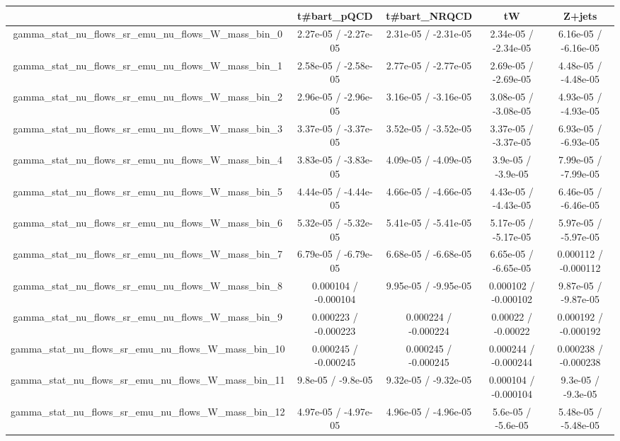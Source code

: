 \documentclass[10pt]{article}
\begin{document}
\begin{table}[htbp]
\begin{center}
\begin{tabular}{|c|c|c|c|c|}
\hline 
      & t#bar{t}_{pQCD}      & t#bar{t}_{NRQCD}      & tW      & Z+jets \\ 
\hline 
  gamma_stat_nu_flows_sr_emu_nu_flows_W_mass_bin_0 & 2.27e-05 / -2.27e-05 & 2.31e-05 / -2.31e-05 & 2.34e-05 / -2.34e-05 & 6.16e-05 / -6.16e-05 \\ 
  gamma_stat_nu_flows_sr_emu_nu_flows_W_mass_bin_1 & 2.58e-05 / -2.58e-05 & 2.77e-05 / -2.77e-05 & 2.69e-05 / -2.69e-05 & 4.48e-05 / -4.48e-05 \\ 
  gamma_stat_nu_flows_sr_emu_nu_flows_W_mass_bin_2 & 2.96e-05 / -2.96e-05 & 3.16e-05 / -3.16e-05 & 3.08e-05 / -3.08e-05 & 4.93e-05 / -4.93e-05 \\ 
  gamma_stat_nu_flows_sr_emu_nu_flows_W_mass_bin_3 & 3.37e-05 / -3.37e-05 & 3.52e-05 / -3.52e-05 & 3.37e-05 / -3.37e-05 & 6.93e-05 / -6.93e-05 \\ 
  gamma_stat_nu_flows_sr_emu_nu_flows_W_mass_bin_4 & 3.83e-05 / -3.83e-05 & 4.09e-05 / -4.09e-05 & 3.9e-05 / -3.9e-05 & 7.99e-05 / -7.99e-05 \\ 
  gamma_stat_nu_flows_sr_emu_nu_flows_W_mass_bin_5 & 4.44e-05 / -4.44e-05 & 4.66e-05 / -4.66e-05 & 4.43e-05 / -4.43e-05 & 6.46e-05 / -6.46e-05 \\ 
  gamma_stat_nu_flows_sr_emu_nu_flows_W_mass_bin_6 & 5.32e-05 / -5.32e-05 & 5.41e-05 / -5.41e-05 & 5.17e-05 / -5.17e-05 & 5.97e-05 / -5.97e-05 \\ 
  gamma_stat_nu_flows_sr_emu_nu_flows_W_mass_bin_7 & 6.79e-05 / -6.79e-05 & 6.68e-05 / -6.68e-05 & 6.65e-05 / -6.65e-05 & 0.000112 / -0.000112 \\ 
  gamma_stat_nu_flows_sr_emu_nu_flows_W_mass_bin_8 & 0.000104 / -0.000104 & 9.95e-05 / -9.95e-05 & 0.000102 / -0.000102 & 9.87e-05 / -9.87e-05 \\ 
  gamma_stat_nu_flows_sr_emu_nu_flows_W_mass_bin_9 & 0.000223 / -0.000223 & 0.000224 / -0.000224 & 0.00022 / -0.00022 & 0.000192 / -0.000192 \\ 
  gamma_stat_nu_flows_sr_emu_nu_flows_W_mass_bin_10 & 0.000245 / -0.000245 & 0.000245 / -0.000245 & 0.000244 / -0.000244 & 0.000238 / -0.000238 \\ 
  gamma_stat_nu_flows_sr_emu_nu_flows_W_mass_bin_11 & 9.8e-05 / -9.8e-05 & 9.32e-05 / -9.32e-05 & 0.000104 / -0.000104 & 9.3e-05 / -9.3e-05 \\ 
  gamma_stat_nu_flows_sr_emu_nu_flows_W_mass_bin_12 & 4.97e-05 / -4.97e-05 & 4.96e-05 / -4.96e-05 & 5.6e-05 / -5.6e-05 & 5.48e-05 / -5.48e-05 \\ 

\end{tabular}
\end{center}
\end{table}
\end{document}
